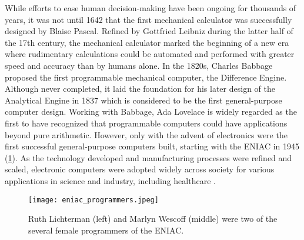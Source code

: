 While efforts to ease human decision-making have been ongoing for thousands of years, it was not until 1642 that the first mechanical calculator was successfully designed by Blaise Pascal. Refined by Gottfried Leibniz during the latter half of the 17th century, the mechanical calculator marked the beginning of a new era where rudimentary calculations could be automated and performed with greater speed and accuracy than by humans alone. 
In the 1820s, Charles Babbage proposed the first programmable mechanical computer, the Difference Engine. Although never completed, it laid the foundation for his later design of the Analytical Engine in 1837 which is considered to be the first general-purpose computer design. 
Working with Babbage, Ada Lovelace is widely regarded as the first to have recognized that programmable computers could have applications beyond pure arithmetic. However, only with the advent of electronics were the first successful general-purpose computers built, starting with the ENIAC in 1945 (\cref{fig:eniac_programmers}).
As the technology developed and manufacturing processes were refined and scaled, electronic computers were adopted widely across society for various applications in science and industry, including healthcare \parencite{georges_universal_2001, harari_sapiens_2011}.

\begin{figure}[t]
    \centering
    \texttt{[image: eniac\_programmers.jpeg]}
    \caption[Ruth Lichterman (left) and Marlyn Wescoff (middle) were two of the several female programmers of the ENIAC, the world's first general-purpose electronic computer.]{ Ruth Lichterman (left) and Marlyn Wescoff (middle) were two of the several female programmers of the ENIAC. \parencite[photo credit][]{usarmyresearchlaboratoryarltechnicallibrary_female_1940}}
    \label{fig:eniac_programmers}
\end{figure}

